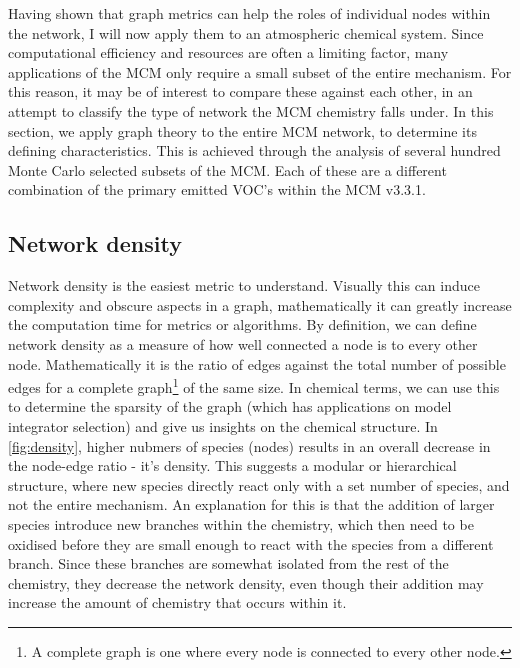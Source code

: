Having shown that graph metrics can help the roles of individual nodes within the network, I will now apply them to an atmospheric chemical system. Since computational efficiency and resources are often a limiting factor, many applications of the MCM only require a small subset of the entire mechanism. For this reason, it may be of interest to compare these against each other, in an attempt to classify the type of network the MCM chemistry falls under. In this section, we apply graph theory to the entire MCM network, to determine its defining characteristics. This is achieved through the analysis of several hundred Monte Carlo selected subsets of the MCM. Each of these are a different combination of the primary emitted VOC's within the MCM v3.3.1.

\subsection{Network density}\label{sec:netdensity}
Network density is the easiest metric to understand. Visually this can induce complexity and obscure aspects in a graph, mathematically it can greatly increase the computation time for metrics or algorithms. By definition, we can define network density as a measure of how well connected a node is to every other node. Mathematically it is the ratio of edges against the total number of possible edges for a complete graph\footnote{A complete graph is one where every node is connected to every other node.} of the same size. In chemical terms, we can use this to determine the sparsity of the graph (which has applications on model integrator selection) and give us insights on the chemical structure.  In \autoref{fig:density}, higher nubmers of species (nodes) results in an overall decrease in the node-edge ratio - it's density. This suggests a modular or hierarchical structure, where new species directly react only with a set number of species, and not the entire mechanism. An explanation for this is that the addition of larger species introduce new branches within the chemistry, which then need to be oxidised before they are small enough to react with the species from a different branch.  Since these branches are somewhat isolated from the rest of the chemistry, they decrease the network density, even though their addition may increase the amount of chemistry that occurs within it.

